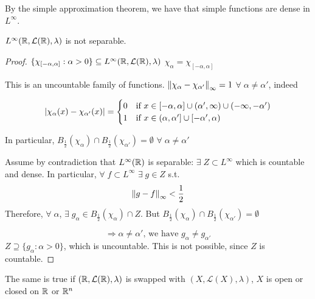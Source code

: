 By the simple approximation theorem, we have that simple functions are dense in \(L^\infty\).
\begin{theorem}
    \(L^{\infty}(\mathbb{R}, \mathcal{L}(\mathbb{R}), \lambda)\) is not separable.
\end{theorem}
\begin{proof}
    \(\{\chi_{[-\alpha, \alpha]}: \alpha >0\} \subseteq L^{\infty}(\mathbb{R}, \mathcal{L}(\mathbb{R}), \lambda)\)
    \(\chi_\alpha = \chi_{[-\alpha, \alpha]}\)

    This is an uncountable family of functions. \(\norm{\chi_\alpha - \chi_{\alpha'}}_{\infty}=1\) \(\forall \; \alpha \neq \alpha'\), indeed

    \[
        \abs{\chi_\alpha(x) - \chi_{\alpha'}(x)} =
        \begin{cases}
            0 & \text{if } x \in [-\alpha, \alpha] \cup (\alpha', \infty) \cup (-\infty, -\alpha')\\
            1 & \text{if } x \in (\alpha, \alpha'] \cup [-\alpha', \alpha)    
        \end{cases}
    \]

    In particular, \(B_{\frac{1}{2}}(\chi_\alpha) \cap B_{\frac{1}{2}}(\chi_{\alpha '}) = \emptyset \) \(\forall \; \alpha \neq \alpha'\)

    Assume by contradiction that \(L^\infty(\mathbb{R})\) is separable: \(\exists \; Z \subset L^\infty\) which is countable and dense. In particular, \(\forall \; f \subset L^\infty\) \(\exists \; g \in Z\) s.t. 
    \[
        \norm{g-f }_\infty < \frac{1}{2}
    \]
    Therefore, \(\forall \; \alpha\), \(\exists \;g_\alpha \in B_{\frac{1}{2}}(\chi_\alpha) \cap Z\). 
    But \( B_{\frac{1}{2}}(\chi_\alpha) \cap B_{\frac{1}{2}}(\chi_{\alpha'}) = \emptyset \)

    \[
        \Rightarrow \alpha \neq \alpha' \text{, we have } g_\alpha \neq g_{\alpha'}
    \]
    \(Z \supseteq \{ g_\alpha : \alpha >0 \}\), which is uncountable. This is not possible, since \(Z\) is countable.
\end{proof}

\begin{remark}
    The same is true if \((\mathbb{R}, \mathcal{L}(\mathbb{R}), \lambda)\) is swapped with \((X, \mathcal{L}(X), \lambda)\), \(X\) is open or closed on \(\mathbb{R}\) or \(\mathbb{R}^n\)
\end{remark}
